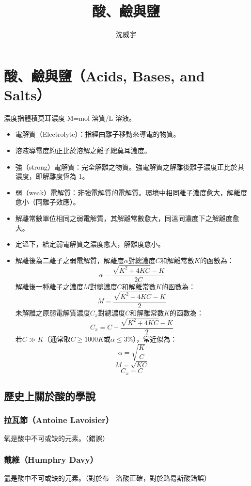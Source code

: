 \documentclass[a4paper,12pt]{article}
\begin{document}
\title{酸、鹼與鹽}
\author{沈威宇}
\date{\temtoday}
\titletocdoc
\section{酸、鹼與鹽（Acids, Bases, and Salts）}
濃度指體積莫耳濃度 M=mol 溶質/L 溶液。
\begin{itemize}
\item 電解質（Electrolyte）：指經由離子移動來導電的物質。
\item 溶液導電度約正比於溶解之離子總莫耳濃度。
\item 強（strong）電解質：完全解離之物質。強電解質之解離後離子濃度正比於其濃度，即解離度恆為 1。
\item 弱（weak）電解質：非強電解質的電解質。環境中相同離子濃度愈大，解離度愈小（同離子效應）。
\item 解離常數單位相同之弱電解質，其解離常數愈大，同溫同濃度下之解離度愈大。
\item 定溫下，給定弱電解質之濃度愈大，解離度愈小。
\item 解離後為二離子之弱電解質，解離度$\alpha$對總濃度$C$和解離常數$K$的函數為：
\[\alpha = \frac{\sqrt{K^2+4KC}-K}{2C}\]
解離後一種離子之濃度$M$對總濃度$C$和解離常數$K$的函數為：
\[M = \frac{\sqrt{K^2+4KC}-K}{2}\]
未解離之原弱電解質濃度$C_x$對總濃度$C$和解離常數$K$的函數為：
\[C_x = C-\frac{\sqrt{K^2+4KC}-K}{2}\]
若$C\gg K$（通常取$C\geq 1000 K$或$\alpha\leq 3\%$），常近似為：
\[\alpha=\sqrt{\frac{K}{C}}\]
\[M=\sqrt{KC}\]
\[C_x=C\]
\end{itemize}
\subsection{歷史上關於酸的學說}
\subsubsection{拉瓦節（Antoine Lavoisier）}
氧是酸中不可或缺的元素。（錯誤）
\subsubsection{戴維（Humphry Davy）}
氫是酸中不可或缺的元素。（對於布—洛酸正確，對於路易斯酸錯誤）
\end{document}
